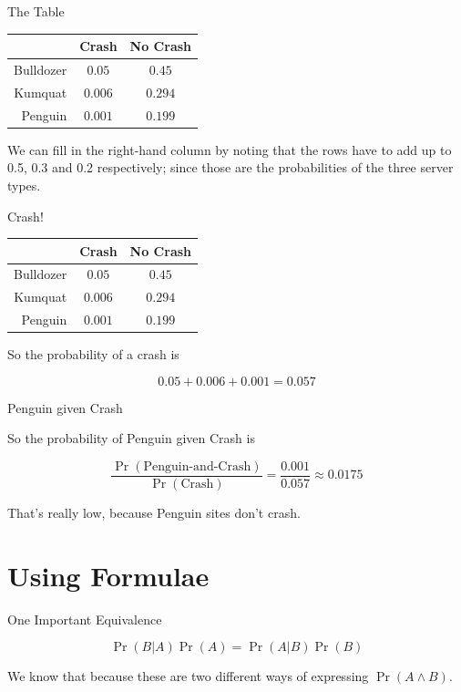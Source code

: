 \documentclass[
  ignorenonframetext,
]{beamer}
\renewcommand{\,}{\text{, }}
\begin{document}
\begin{frame}{The Table}
\protect\hypertarget{the-table-5}{}

\begin{longtable}[]{@{}rcc@{}}
\toprule
& Crash & No Crash\tabularnewline
\midrule
\endhead
Bulldozer & \(0.05\) & \(0.45\)\tabularnewline
Kumquat & \(0.006\) & \(0.294\)\tabularnewline
Penguin & \(0.001\) & \(0.199\)\tabularnewline
\bottomrule
\end{longtable}

We can fill in the right-hand column by noting that the rows have to add
up to 0.5, 0.3 and 0.2 respectively; since those are the probabilities
of the three server types.

\end{frame}

\begin{frame}{Crash!}
\protect\hypertarget{crash}{}

\begin{longtable}[]{@{}rcc@{}}
\toprule
& Crash & No Crash\tabularnewline
\midrule
\endhead
Bulldozer & \(0.05\) & \(0.45\)\tabularnewline
Kumquat & \(0.006\) & \(0.294\)\tabularnewline
Penguin & \(0.001\) & \(0.199\)\tabularnewline
\bottomrule
\end{longtable}

So the probability of a crash is

\[
0.05 + 0.006 + 0.001 = 0.057
\]

\end{frame}

\begin{frame}{Penguin given Crash}
\protect\hypertarget{penguin-given-crash}{}

So the probability of Penguin given Crash is

\[
\frac{\Pr(\text{Penguin-and-Crash})}{\Pr(\text{Crash})} = \frac{0.001}{0.057} \approx 0.0175
\]

\pause

That's really low, because Penguin sites don't crash.

\end{frame}

\hypertarget{using-formulae}{%
\section{Using Formulae}\label{using-formulae}}

\begin{frame}{One Important Equivalence}
\protect\hypertarget{one-important-equivalence}{}

\[
\Pr(B | A) \Pr(A) = \Pr(A | B) \Pr(B)
\]

We know that because these are two different ways of expressing
\(\Pr(A \wedge B)\).

\end{frame}
\end{document}
